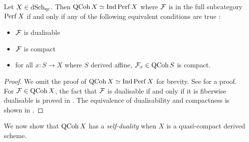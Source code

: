 \documentclass[./main.tex]{subfiles}
\begin{document}
\begin{prop}

  Let $X \in \mathrm{dSch}_\mathrm{qc}$. 
  Then $\mathrm{QCoh}\,X \simeq \mathrm{Ind}\,\mathrm{Perf}\,X$ where
  $\mathcal{F}$ is in the full subcategory $\mathrm{Perf}\,X$ if and only if
  any of the following equivalent conditions are true : 
  \begin{itemize}
    \item $\mathcal{F}$ is dualisable
    \item $\mathcal{F}$ is compact
    \item for all $x : S \to X$ where $S$ derived affine,
    $\mathcal{F}_x \in \mathrm{QCoh}\,S$ is compact.
  \end{itemize}
\end{prop}
\begin{proof}
  
  We omit the proof of $\mathrm{QCoh}\,X \simeq \mathrm{Ind}\,\mathrm{Perf}\,X$ for brevity.
  See \cite[Prop 3.19]{BZFN} for a proof.
  For $\mathcal{F} \in \mathrm{QCoh}\,X$,
  the fact that $\mathcal{F}$ is dualisable if and only if
  it is fiberwise dualisable is proved in \cite[Prop 3.6]{BZFN}.
  The equivalence of dualisability and compactness
  is shown in \cite[Prop 3.9]{BZFN}.
\end{proof}

We now show that $\mathrm{QCoh}\,X$ has a \emph{self-duality} when 
$X$ is a quasi-compact derived scheme.
\end{document}
